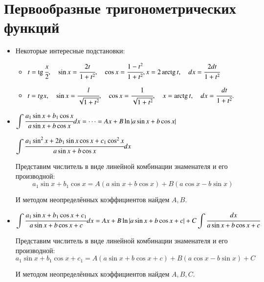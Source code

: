 \documentclass[twoside, a4paperpt]{extarticle}
\begin{document}
\begin{itemize}
\end{itemize}
\section*{Первообразные тригонометрических функций}
\begin{itemize}
    \item Некоторые интересные подстановки:
    \begin{itemize}
        \item $ t=\operatorname{tg} \cfrac{x}{2}, \quad \sin x=\cfrac{2 t}{1+t^{2}}, \quad \cos x=\cfrac{1-t^{2}}{1+t^{2}}, x=2 \operatorname{arctg} t, \quad d x=\cfrac{2 d t}{1+t^{2}}$
    
        \item $t = tg x, \quad \sin x=\cfrac{l}{\sqrt{1+t^{2}}}, \quad \cos x=\cfrac{1}{\sqrt{1+t^{2}}}, \quad x=\operatorname{arctg} t, \quad d x=\cfrac{d t}{1+t^{2}} .$
    \end{itemize}

    \item $\displaystyle \int \cfrac{a_{1} \sin x+b_{1} \cos x}{a \sin x+b \cos x} d x =\cdots = A x+B \ln |a \sin x+b \cos x| $
    
    $\displaystyle \int \cfrac{a_{1} \sin ^{2} x+2 b_{1} \sin x \cos x+c_{1} \cos ^{2} x}{a \sin x+b \cos x} d x$
    
    Представим числитель в виде линейной комбинации знаменателя и его производной: 
    $$a_{1} \sin x+b_{1} \cos x=A(a \sin x+b \cos x)+B(a \cos x-b \sin x)$$

    И методом неопределённых коэффициентов найдем $A, B$.

    \item $\displaystyle \int \cfrac{a_{1} \sin x+b_{1} \cos x+c_{1}}{a \sin x+b \cos x+c} d x=A x+B \ln |a \sin x+b \cos x+c|+C \displaystyle \int \cfrac{d x}{a \sin x+b \cos x+c} $
    
    Представим числитель в виде линейной комбинации знаменателя и его производной: 
    $$ a_{1} \sin x+b_{1} \cos x+c_{1}=A(a \sin x+b \cos x+c)+B(a \cos x-b \sin x)+C $$

    И методом неопределённых коэффициентов найдем $A, B, C$.
    

\end{itemize}
\end{document}
